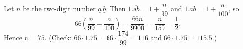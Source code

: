 Let $n$ be the two-digit number $\underline{a}\,\underline{b}$. Then $1.\overline{ab}=1+\dfrac{n}{99}$ and $1.ab=1+\dfrac{n}{100}$, so
\[66\left(\dfrac n{99}-\dfrac n{100}\right)=\dfrac{66n}{9900}=\dfrac{n}{150}=\dfrac12.\]
Hence $n=\boxed{75}$. (Check: $66\cdot1.\overline{75}=66\cdot\dfrac{174}{99}=116$ and $66\cdot1.75=115.5$.)
